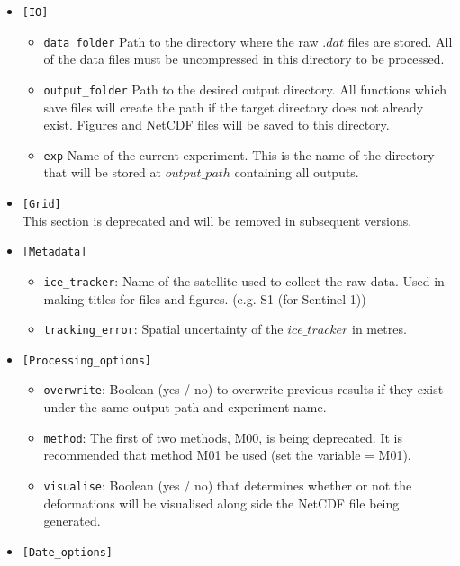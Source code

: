 \documentclass{article}
\begin{document}
        \begin{itemize}
            \item{} \verb?[IO]?
            \begin{itemize}
                \item \verb?data_folder? Path to the directory where the raw $.dat$ files are stored. All of the data files must be uncompressed in this directory to be processed.
                \item \verb?output_folder? Path to the desired output directory. All functions which save files will create the path if the target directory does not already exist. Figures and NetCDF files will be saved to this directory.
                \item \verb?exp? Name of the current experiment. This is the name of the directory that will be stored at $output\_path$ containing all outputs.
            \end{itemize}
            \item{} \verb?[Grid]? \\
                This section is deprecated and will be removed in subsequent versions.
            \item{} \verb?[Metadata]?
            \begin{itemize}
                \item \verb?ice_tracker?: Name of the satellite used to collect the raw data. Used in making titles for files and figures. (e.g. S1 (for Sentinel-1))
                \item \verb?tracking_error?: Spatial uncertainty of the $ice\_tracker$ in metres.
            \end{itemize}
            \item{} \verb?[Processing_options]?
            \begin{itemize}
                \item \verb?overwrite?: Boolean (yes / no) to overwrite previous results if they exist under the same output path and experiment name.
                \item \verb?method?: The first of two methods, M00, is being deprecated. It is recommended that method M01 be used (set the variable = M01).
                \item \verb?visualise?: Boolean (yes / no) that determines whether or not the deformations will be visualised along side the NetCDF file being generated.
            \end{itemize}
            \item{} \verb?[Date_options]?

\end{itemize}
\end{document}
